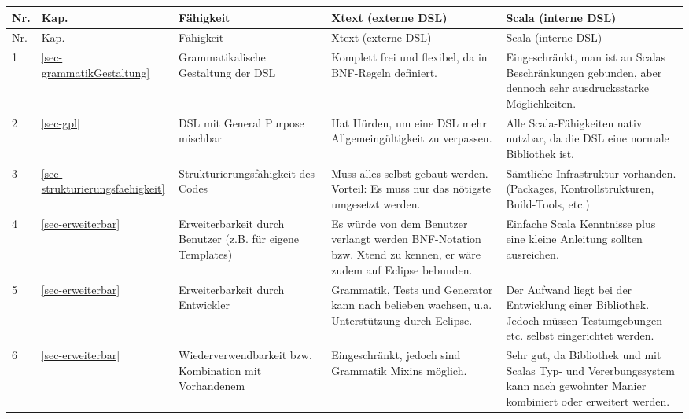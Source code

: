 \begin{landscape}
\begin{longtable}{|p{0.5cm}|p{0.8cm}|p{4.3cm}|p{6.3cm}|p{6.3cm}|}

  \hline
  Nr. & Kap. & Fähigkeit & Xtext (externe DSL) & Scala (interne DSL) \\ \hline \hline
  \endfirsthead

  \hline
  Nr. & Kap. & Fähigkeit & Xtext (externe DSL) & Scala (interne DSL) \\ \hline
  \endhead

  1
  & \ref{sec-grammatikGestaltung}
  & Grammatikalische Gestaltung der DSL
  & {\small Komplett frei und flexibel, da in BNF-Regeln definiert.}
  & {\small Eingeschränkt, man ist an Scalas Beschränkungen gebunden, aber
    dennoch sehr ausdrucksstarke Möglichkeiten.}
  \\\hline

  2
  & \ref{sec-gpl}
  & DSL mit General Purpose mischbar
  & {\small Hat Hürden, um eine DSL mehr Allgemeingültigkeit zu verpassen.}
  & {\small Alle Scala-Fähigkeiten nativ nutzbar, da die DSL eine normale Bibliothek ist.}
  \\\hline

  3
  & \ref{sec-strukturierungsfaehigkeit}
  & Strukturierungsfähigkeit des Codes
  & {\small Muss alles selbst gebaut werden. Vorteil: Es muss nur das nötigste
    umgesetzt werden.}
  & {\small Sämtliche Infrastruktur vorhanden. (Packages, Kontrollstrukturen,
    Build-Tools, etc.)}
  \\\hline

  4
  & \ref{sec-erweiterbar}
  & Erweiterbarkeit durch Benutzer (z.B. für eigene Templates)
  & {\small Es würde von dem Benutzer verlangt werden BNF-Notation bzw. Xtend zu kennen, er wäre zudem auf Eclipse bebunden.}
  & {\small Einfache Scala Kenntnisse plus eine kleine Anleitung sollten ausreichen.}
  \\\hline

  5
  & \ref{sec-erweiterbar}
  & Erweiterbarkeit durch Entwickler
  & {\small Grammatik, Tests und Generator kann nach belieben wachsen, u.a.
    Unterstützung durch Eclipse.}
  & {\small Der Aufwand liegt bei der Entwicklung einer Bibliothek. Jedoch müssen
    Testumgebungen etc. selbst eingerichtet werden.}
  \\\hline

  6
  & \ref{sec-erweiterbar}
  & Wiederverwendbarkeit bzw. Kombination mit Vorhandenem
  & {\small Eingeschränkt, jedoch sind Grammatik Mixins möglich.}
  & {\small Sehr gut, da Bibliothek und mit Scalas Typ- und Vererbungssystem
      kann nach gewohnter Manier kombiniert oder erweitert werden.}
  \\\hline


\end{longtable}
\end{landscape}
